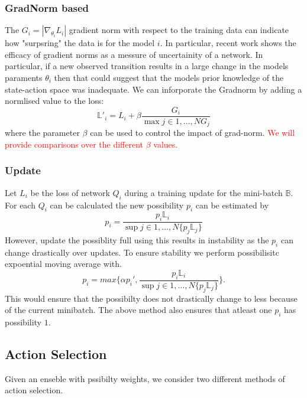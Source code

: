 \documentclass[12pt,a4paper]{report}
\newcommand\myworries[1]{\textcolor{red}{#1}}
\begin{document}
\subsubsection{GradNorm based}
The $G_i = |\nabla_{\theta_i}L_i| $ gradient norm with respect to the training data can indicate how "surpsring" the data is for the model $i$. In particular, recent work \cite{Lee2020} shows the efficacy of gradient norms as a messure of uncertainity of a network. In particular, if a new observed transition results in a large change in the models paraments $\theta_i$ then that could suggest that the models prior knowledge of the state-action space was inadequate. We can inforporate the Gradnorm by adding a normlised value to the loss:
\[
  \mathbb{L}'_i = L_i + \beta \frac{G_i}{\max{j \in 1, \dots, N} G_j}
\]
where the parameter $\beta$ can be used to control the impact of grad-norm. \myworries{We will provide comparisons over the different $\beta$ values.}
\subsubsection{Update}
\par
Let $L_i$ be the loss of network $Q_i$ during a training update for the mini-batch $ \mathbb{B}$. 
For each $Q_i$ can be calculated the new possibility $p_i$ can be estimated by 
\[
  p_i = \frac{p_i \mathbb{L}_i}{\sup{j \in 1, \dots, N}\{p_j \mathbb{L}_j\}}
\]
However, update the possiblity full using this results in instability as the $p_i$ can change drastically over updates. To ensure stability we perform possibilisitc expoential moving average with. 
\[
  p_i = max \{\alpha p_i', \frac{p_i \mathbb{L}_i}{\sup{j \in 1, \dots, N}\{p_j \mathbb{L}_j\}} \}. 
\]
This would ensure that the possibilty does not drastically change to less because of the current minibatch. The above method also ensures that  atleast one $p_i$ has possibility $1$. \par

\subsection{Action Selection}

Given an enseble with pssibilty weights, we consider two different methods of action selection. 
\end{document}
